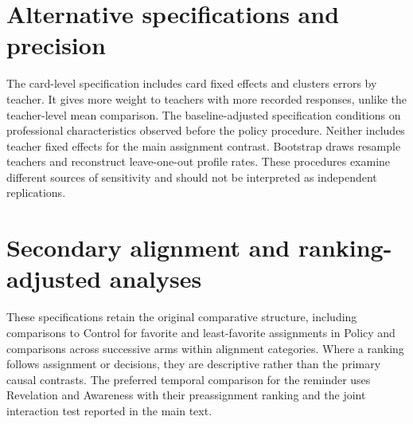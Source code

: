 \section{Alternative specifications and precision}
The card-level specification includes card fixed effects and clusters errors by teacher. It gives more weight to teachers with more recorded responses, unlike the teacher-level mean comparison. The baseline-adjusted specification conditions on professional characteristics observed before the policy procedure. Neither includes teacher fixed effects for the main assignment contrast. Bootstrap draws resample teachers and reconstruct leave-one-out profile rates. These procedures examine different sources of sensitivity and should not be interpreted as independent replications.

\section{Secondary alignment and ranking-adjusted analyses}
These specifications retain the original comparative structure, including comparisons to Control for favorite and least-favorite assignments in Policy and comparisons across successive arms within alignment categories. Where a ranking follows assignment or decisions, they are descriptive rather than the primary causal contrasts. The preferred temporal comparison for the reminder uses Revelation and Awareness with their preassignment ranking and the joint interaction test reported in the main text.

